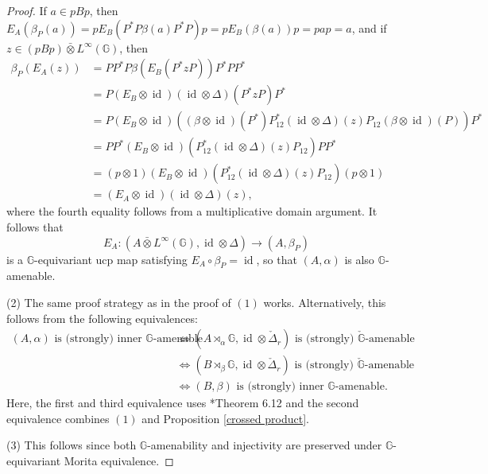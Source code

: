 \documentclass[reqno]{amsart}
\numberwithin{equation}{section}
\DeclareMathOperator{\id}{\mathrm{id}}
\newcommand{\G}{\mathbb{G}}
\newcommand{\ovot}{\bar{\otimes}}
\begin{document}
\begin{proof}
    If $a \in pBp$, then $E_A(\beta_P(a)) = pE_B(P^*P \beta(a)P^*P)p= pE_B(\beta(a))p = pap = a$, and if $z\in (pBp)\ovot L^\infty(\G)$, then
    \begin{align*}
    \beta_P(E_A(z))&= P P^*P \beta(E_B(P^*zP))P^*PP^*\\
    &= P (E_B\otimes \id)(\id \otimes \Delta)(P^*zP) P^*\\
    &= P(E_B\otimes \id)((\beta \otimes \id)(P^*)P_{12}^*(\id \otimes \Delta)(z)P_{12}(\beta \otimes \id)(P))P^*\\
    &=PP^* (E_B\otimes \id)(P_{12}^* (\id \otimes \Delta)(z) P_{12}) PP^*\\
    &= (p\otimes 1)(E_B\otimes \id)(P_{12}^*(\id \otimes \Delta)(z)P_{12})(p\otimes 1)\\
    &= (E_A\otimes \id)(\id \otimes \Delta)(z),
    \end{align*}
    where the fourth equality follows from a multiplicative domain argument. It follows that $$E_A: (A \ovot L^\infty(\G), \id \otimes \Delta)\to (A, \beta_P)$$ is a $\G$-equivariant ucp map satisfying $E_A\circ \beta_P = \id$, so that $(A, \alpha)$ is also $\G$-amenable.

    (2) The same proof strategy as in the proof of $(1)$ works. Alternatively, this follows from the following equivalences:
    \begin{align*}
(A, \alpha) \textrm{\ is (strongly) inner } \G \textrm{-amenable}&\iff  (A\rtimes_\alpha \G, \id \otimes \check{\Delta}_r) \textrm{\ is (strongly) } \check{\G} \textrm{-amenable}\\
&\iff (B\rtimes_\beta \G, \id \otimes \check{\Delta}_r) \textrm{\ is (strongly) } \check{\G} \textrm{-amenable}\\
&\iff(B, \beta) \textrm{\ is (strongly) inner } \G \textrm{-amenable}.
    \end{align*}
Here, the first and third equivalence uses \cite{DCDR24a}*{Theorem 6.12} and the second equivalence combines $(1)$ and Proposition \ref{crossed product}.

(3) This follows since both $\G$-amenability and injectivity are preserved under $\G$-equivariant Morita equivalence.
\end{proof}
\end{document}

